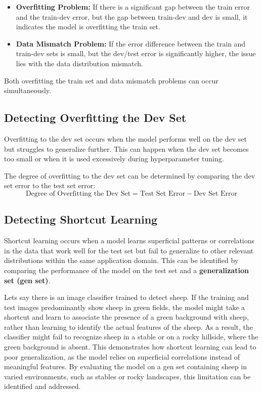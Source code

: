 \documentclass[12pt,openany, draft]{book}
\begin{document}
\begin{itemize}
    \item \textbf{Overfitting Problem:} If there is a significant gap between the train error and the train-dev error, but the gap between train-dev and dev is small, it indicates the model is overfitting the train set. 
    \item \textbf{Data Mismatch Problem:} If the error difference between the train and train-dev sets is small, but the dev/test error is significantly higher, the issue lies with the data distribution mismatch.
\end{itemize}

\begin{notebox}
Both overfitting the train set and data mismatch problems can occur simultaneously.
\end{notebox}


\subsection{Detecting Overfitting the Dev Set}

Overfitting to the dev set occurs when the model performs well on the dev set but struggles to generalize further. This can happen when the dev set becomes too small or when it is used excessively during hyperparameter tuning. \newline

The degree of overfitting to the dev set can be determined by comparing the dev set error to the test set error:
\[
\text{Degree of Overfitting the Dev Set} = \text{Test Set Error} - \text{Dev Set Error}
\]


\subsection{Detecting Shortcut Learning} \label{subsec:detecting-shortcut-learning}

Shortcut learning occurs when a model learns superficial patterns or correlations in the data that work well for the test set but fail to generalize to other relevant distributions within the same application domain. This can be identified by comparing the performance of the model on the test set and a \textbf{generalization set (gen set)}. \newline

\begin{examplebox}
Lets say there is an image classifier trained to detect sheep. If the training and test images predominantly show sheep in green fields, the model might take a shortcut and learn to associate the presence of a green background with sheep, rather than learning to identify the actual features of the sheep. As a result, the classifier might fail to recognize sheep in a stable or on a rocky hillside, where the green background is absent. This demonstrates how shortcut learning can lead to poor generalization, as the model relies on superficial correlations instead of meaningful features. By evaluating the model on a gen set containing sheep in varied environments, such as stables or rocky landscapes, this limitation can be identified and addressed. 
\end{examplebox}
\end{document}
